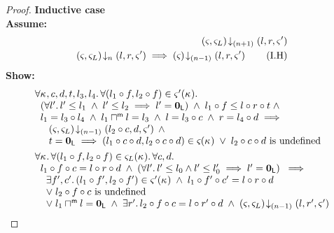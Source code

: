 \begin{lemma}[]
\begin{proof}
\noindent\textbf{Inductive case}\\
\textbf{Assume:}
%
\begin{align}
	\left(\varsigma_{}, \varsigma_{L}\right) \!\downarrow_{(n+1)} \left(l, r, \varsigma_{}'\right) \label{L9:Ass1}\\
	\left(\varsigma_{}, \varsigma_{L}\right) \!\downarrow_{n} \left(l, r, \varsigma_{}'\right) \implies \left(\varsigma_{}\right) \!\downarrow_{(n-1)} \left(l, r, \varsigma_{}'\right) \tag{I.H} \label{L9:I.H}
\end{align}
%
\textbf{Show:}
%
\begin{align}
	&\begin{array}{l}
			\for{\ca{}, c, d, t, l_3, l_4} \for{(l_1 \composeL f, l_2 \composeL f) \in \amod{}'(\ca{})} \\
%			
			\hspace*{0.2cm}\left(\for{l'} l' \leq l_1 \;\land\; l' \leq l_2 \implies l' = \unitL \right) \;\land\; l_1 \composeL f \leq l \composeL r \composeL t \;\land\\
%			
			\hspace*{0.2cm} l_1 = l_3 \composeL l_4 \;\land\; 	l_1 \maxMeetL l = l_3 \;\land\; l = l_3 \composeL c \;\land\; r = l_4 \composeL d \implies \\
%			
			\hspace*{0.5cm}\extendsAMUpto{\amod{}, \amod{L}}{(n-1)}{l_2 \composeL c}{d}{\amod{}'} \;\land\\
			\hspace*{0.5cm} t = \unitL \implies (l_1 \composeL c \composeL d, l_2 \composeL c \composeL d) \in \amod{}(\ca{}) 
			\;\lor\; l_2 \composeL c \composeL d \text{ is undefined} 	
	\end{array}\label{L9:Goal1}\\
%
  &\begin{array}{l}
  	\for{\ca{}} \for{(l_1 \composeL f, l_2 \composeL f) \in \amod{L}(\ca{})} \for{c, d} \\
  \hspace*{0.2cm} l_1 \composeL f \composeL c = l \composeL r \composeL d \;\land\; \left(\for{l'} l' \leq l_0 \land l' \leq l'_0 \implies l' = \unitL\right)  \;\implies\\
  \hspace*{0.4cm}\exsts{f', c'} (l_1 \composeL f', l_2 \composeL f') \in \amod{}'(\ca{}) \;\land\; l_1 \composeL f' \composeL c' =  l \composeL r \composeL d\\
		\hspace*{0.4cm}\lor\;l_2 \composeL f \composeL c \text{ is undefined}\\
		\hspace*{0.4cm}\lor\; l_1 \maxMeetL l = \unitL \;\land\; \exsts{r'} l_2 \composeL f \composeL c = l \composeL r' \composeL d \;\land\; \extendsAMUpto{\amod{}, \amod{L}}{(n-1)}{l}{r'}{\amod{}'}
  \end{array} \label{L9:Goal2}
\end{align}
%


\end{proof}
\end{lemma}
